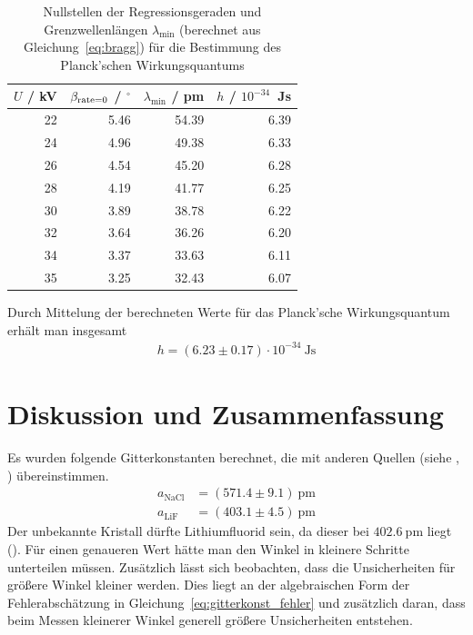 \documentclass{article}
\begin{document}
\begin{table}[H]
\caption{Nullstellen der Regressionsgeraden und Grenzwellenlängen $\lambda_{\min}$ (berechnet aus Gleichung~\ref{eq:bragg}) für die Bestimmung des Planck'schen Wirkungsquantums}
\label{tab:planck_calc}

\begin{tabular}{r|rr|r}
$U$ / kV & $\beta_{\text{\text{rate}=0}}$ / ${}^\circ$ & $\lambda_{\text{min}}$ / pm & $h$ / $10^{-34}$~Js \\
\hline
22 & 5.46 & 54.39 & 6.39 \\
24 & 4.96 & 49.38 & 6.33 \\
26 & 4.54 & 45.20 & 6.28 \\
28 & 4.19 & 41.77 & 6.25 \\
30 & 3.89 & 38.78 & 6.22 \\
32 & 3.64 & 36.26 & 6.20 \\
34 & 3.37 & 33.63 & 6.11 \\
35 & 3.25 & 32.43 & 6.07

\end{tabular}
\end{table}


Durch Mittelung der berechneten Werte für das Planck'sche Wirkungsquantum erhält man insgesamt
\begin{align*}
h = (6.23 \pm 0.17)\cdot 10^{-34}~\text{Js}
\end{align*}

\newpage

\section{Diskussion und Zusammenfassung}

Es wurden folgende Gitterkonstanten berechnet, die mit anderen Quellen (siehe \cite{nacl}, \cite{lif}) übereinstimmen.
\begin{align*}
a_\text{NaCl} &= (571.4\pm 9.1)~\text{pm} \\
a_\text{LiF} &= (403.1\pm 4.5)~\text{pm}
\end{align*}
Der unbekannte Kristall dürfte Lithiumfluorid sein, da dieser bei $402.6~$pm liegt (\cite{lif}). Für einen genaueren Wert hätte man den Winkel in kleinere Schritte unterteilen müssen. Zusätzlich lässt sich beobachten, dass die Unsicherheiten für größere Winkel kleiner werden. Dies liegt an der algebraischen Form der Fehlerabschätzung in Gleichung~\eqref{eq:gitterkonst_fehler} und zusätzlich daran, dass beim Messen kleinerer Winkel generell größere Unsicherheiten entstehen.
\end{document}
